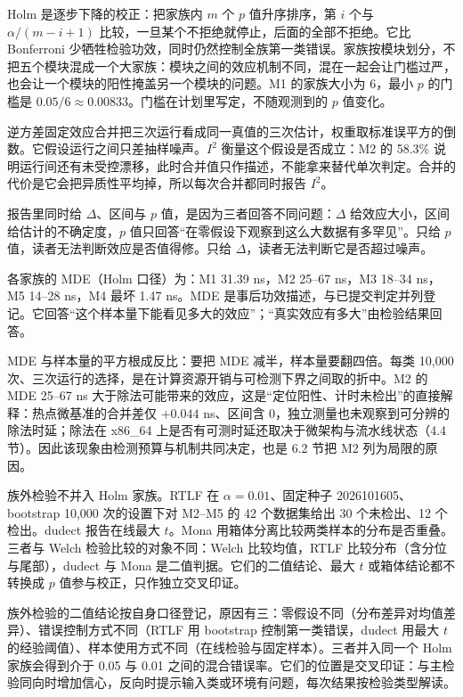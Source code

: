 Holm 是逐步下降的校正：把家族内 $m$ 个 $p$ 值升序排序，第 $i$ 个与 $\alpha/(m-i+1)$ 比较，一旦某个不拒绝就停止，后面的全部不拒绝。它比 Bonferroni 少牺牲检验功效，同时仍然控制全族第一类错误。家族按模块划分，不把五个模块混成一个大家族：模块之间的效应机制不同，混在一起会让门槛过严，也会让一个模块的阳性掩盖另一个模块的问题。M1 的家族大小为 6，最小 $p$ 的门槛是 $0.05/6\approx0.00833$。门槛在计划里写定，不随观测到的 $p$ 值变化。

逆方差固定效应合并把三次运行看成同一真值的三次估计，权重取标准误平方的倒数。它假设运行之间只差抽样噪声。$I^2$ 衡量这个假设是否成立：M2 的 58.3\% 说明运行间还有未受控漂移，此时合并值只作描述，不能拿来替代单次判定。合并的代价是它会把异质性平均掉，所以每次合并都同时报告 $I^2$。

报告里同时给 $\Delta$、区间与 $p$ 值，是因为三者回答不同问题：$\Delta$ 给效应大小，区间给估计的不确定度，$p$ 值只回答“在零假设下观察到这么大数据有多罕见”。只给 $p$ 值，读者无法判断效应是否值得修。只给 $\Delta$，读者无法判断它是否超过噪声。

各家族的 MDE（Holm 口径）为：M1 31.39 ns，M2 25--67 ns，M3 18--34 ns，M5 14--28 ns，M4 最坏 1.47 ns。MDE 是事后功效描述，与已提交判定并列登记。它回答“这个样本量下能看见多大的效应”；“真实效应有多大”由检验结果回答。 %

MDE 与样本量的平方根成反比：要把 MDE 减半，样本量要翻四倍。每类 10,000 次、三次运行的选择，是在计算资源开销与可检测下界之间取的折中。M2 的 MDE 25--67 ns 大于除法可能带来的效应，这是“定位阳性、计时未检出”的直接解释：热点微基准的合并差仅 $+0.044$ ns、区间含 0，独立测量也未观察到可分辨的除法时延；除法在 x86\_64 上是否有可测时延还取决于微架构与流水线状态（4.4 节）。因此该现象由检测预算与机制共同决定，也是 6.2 节把 M2 列为局限的原因。

族外检验不并入 Holm 家族。RTLF 在 $\alpha=0.01$、固定种子 2026101605、bootstrap 10,000 次的设置下对 M2--M5 的 42 个数据集给出 30 个未检出、12 个检出\cite{rtlf}。dudect 报告在线最大 $t$\cite{dudect}。Mona 用箱体分离比较两类样本的分布是否重叠。三者与 Welch 检验比较的对象不同：Welch 比较均值，RTLF 比较分布（含分位与尾部），dudect 与 Mona 是二值判据。它们的二值结论、最大 $t$ 或箱体结论都不转换成 $p$ 值参与校正，只作独立交叉印证。 %

族外检验的二值结论按自身口径登记，原因有三：零假设不同（分布差异对均值差异）、错误控制方式不同（RTLF 用 bootstrap 控制第一类错误，dudect 用最大 $t$ 的经验阈值）、样本使用方式不同（在线检验与固定样本）。三者并入同一个 Holm 家族会得到介于 0.05 与 0.01 之间的混合错误率。它们的位置是交叉印证：与主检验同向时增加信心，反向时提示输入类或环境有问题，每次结果按检验类型解读。

